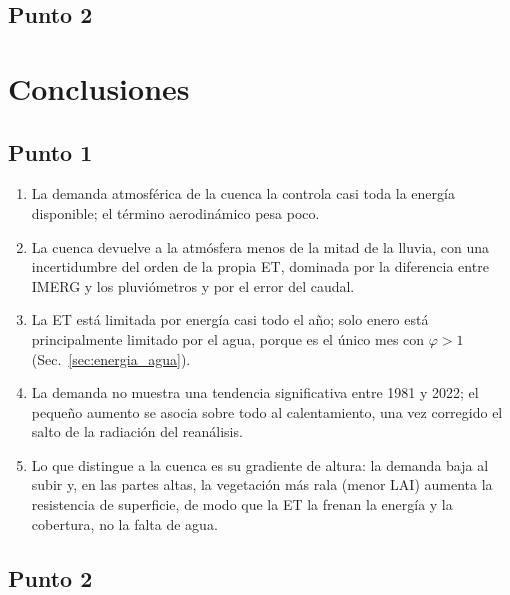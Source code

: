 \documentclass[11pt,letterpaper]{article}
\begin{document}
\subsection{Punto 2}


\section{Conclusiones}
\subsection*{Punto 1}
\begin{enumerate}
  \item La demanda atmosférica de la cuenca la controla casi toda la energía disponible; el término aerodinámico pesa
  poco.
  \item La cuenca devuelve a la atmósfera menos de la mitad de la lluvia, con una incertidumbre del orden de la propia
  ET, dominada por la diferencia entre IMERG y los pluviómetros y por el error del caudal.
  \item La ET está limitada por energía casi todo el año; solo enero está principalmente limitado por el agua, porque
  es el único mes con $\varphi > 1$ (Sec.~\ref{sec:energia_agua}).
\item La demanda no muestra una tendencia significativa entre 1981 y 2022; el pequeño aumento se asocia sobre todo
  al calentamiento, una vez corregido el salto de la radiación del reanálisis.
  \item Lo que distingue a la cuenca es su gradiente de altura: la demanda baja al subir y, en las partes altas, la
  vegetación más rala (menor LAI) aumenta la resistencia de superficie, de modo que la ET la frenan la energía y la
  cobertura, no la falta de agua.
\end{enumerate}

\subsection*{Punto 2}
\end{document}
